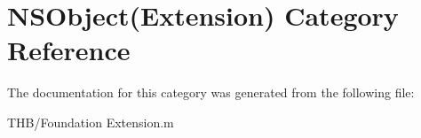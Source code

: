 \hypertarget{category_n_s_object_07_extension_08}{}\section{N\+S\+Object(Extension) Category Reference}
\label{category_n_s_object_07_extension_08}


The documentation for this category was generated from the following file\+:\begin{DoxyCompactItemize}
\item 
T\+H\+B/Foundation Extension.\+m\end{DoxyCompactItemize}
